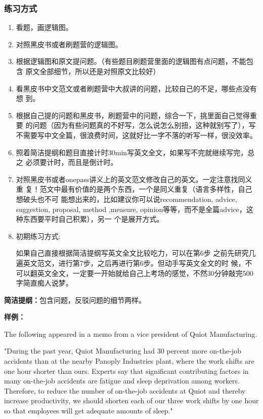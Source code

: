 \documentclass[11pt,a4paper]{article}
\begin{document}
{{{			\subsubsection*{练习方式}{
				\begin{enumerate}
					\item 看题，画逻辑图。
					\item 对照黑皮书或者刷题营的逻辑图。
					\item 根据逻辑图和原文提问题。（有些题目刷题营里面的逻辑图有点问题，不能包含	原文全部细节，所以还是对照原文比较好）
					\item 看黑皮书中文范文或者刷题营中大叔讲的问题，比较自己的不足，哪些点没有想	到。
					\item 根据自己提的问题和黑皮书，刷题营中的问题，综合一下，挑里面自己觉得重要	的问题（因为有些问题真的不好写，怎么说怎么别扭，这种就别写了），写
					不需要写中文全篇，很浪费时间，这就好比一字不落的听写一样，很没效率。
					\item 照着简洁提纲和题目直接计时30min写英文全文，如果写不完就继续写完，总之	必须要计时，而且是倒计时。
					\item 对照黑皮书或者onepass讲义上的英文范文修改自己的英文。一定注意找同义重	复！范文中最有价值的是两个东西，一个是同义重复（语言多样性，自己想破头也不可	能想出来的，比如建议你可以说recommendation, advice, suggestion, proposal, 	method ,measure, opinion等等，而不是全篇advice，这种东西要平时自己积累），另一	个是展开方式。
					
					\item[] 初期练习方式:\par 如果自己直接根据简洁提纲写英文全文比较吃力，可以在第6步	之前先研究几遍英文范文，进行第7步，之后再进行第6步。但动手写英文全文的时	候，不可以翻英文全文，一定要一开始就给自己上考场的感觉，不然30分钟敲完500	字简直痴人说梦。
				\end{enumerate}
				
			}
			\newpage
			{\bfseries\large 简洁提纲：}包含问题，反驳问题的细节两样。
			
			{\bfseries\Large 样例：}
			
			\textrm{
				The following appeared in a memo from a vice president of Quiot Manufacturing.}
				
			\textrm{	
				"During the past year, Quiot Manufacturing had 30 percent more on-the-job accidents than at the nearby Panoply Industries plant, where the work shifts are one hour shorter than ours. Experts say that significant contributing factors in many on-the-job accidents are fatigue and sleep deprivation among workers. Therefore, to reduce the number of on-the-job accidents at Quiot and thereby increase productivity, we should shorten each of our three work shifts by one hour so that employees will get adequate amounts of sleep."}
				
}}}
\end{document}

